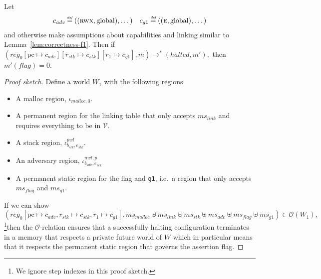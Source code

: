 \documentclass[format=acmsmall, review=true, screen=true]{acmart}
\newcommand{\update}[2]{[#1 \mapsto #2]}
\newcommand{\defeq}{\stackrel{\textit{\tiny{def}}}{=}}
\newcommand{\var}[1]{\mathit{#1}}
\newcommand{\hs}{\var{ms}}
\newcommand{\ms}{\hs}
\newcommand{\pcreg}{\mathrm{pc}}
\newcommand{\reg}{\var{reg}}
\newcommand{\adv}{\var{adv}}
\newcommand{\link}{\var{link}}
\newcommand{\stk}{\var{stk}}
\newcommand{\flag}{\var{flag}}
\newcommand{\nwl}{\var{nwl}}
\newcommand{\pwl}{\var{pwl}}
\newcommand{\halted}{\mathit{halted}}
\newcommand{\codelabel}[1]{\mathit{#1}}
\newcommand{\malloc}{\codelabel{malloc}}
\newcommand{\asmType}{\plaindom{AsmType}}
\newcommand{\plaindom}[1]{\mathrm{#1}}
\newcommand{\intr}[2]{\mathcal{#1}}
\newcommand{\valueintr}[1]{\intr{V}{#1}}
\newcommand{\stdvr}{\valueintr{\asmType}}
\newcommand{\observations}{\mathcal{O}}
\newcommand{\plainperm}[1]{\textsc{#1}}
\newcommand{\entry}{\plainperm{e}}
\newcommand{\rwx}{\plainperm{rwx}}
\newcommand{\plainlocality}[1]{\mathrm{#1}}
\newcommand{\glob}{\plainlocality{global}}
\newcommand{\step}[1][]{\rightarrow_{#1}}
\newenvironment{toplas}%
    {\color{OliveGreen}}{}
\begin{document}
\begin{lemma}
  \label{lem:correctness-g1}
  Let
\[
    \begin{array}{r@{}lr@{}l}
    c_{\var{adv}} & \;\defeq ((\rwx,\glob),\dots) & c_{g1} & \;\defeq ((\entry,\glob),\dots)
    \end{array}
\]
  and otherwise make assumptions about capabilities and linking similar to Lemma~\ref{lem:correctness-f1}.
  Then if $
  (\reg_0\update{\pcreg}{c_\adv}\update{r_\stk}{c_\stk}\update{r_1}{c_{g1}},m) \step^* (\halted,m'),$
  then $m'(\flag) = 0$.
\end{lemma}
\begin{toplas}
  \begin{proof}[Proof sketch]
    Define a world $W_1$ with the following regions
    \begin{itemize}
    \item A malloc region, $\iota_{\malloc,0}$.
    \item A permanent region for the linking table that only accepts $\ms_\link$ and requires everything to be in $\stdvr$.
    \item A stack region, $\iota^{\pwl}_{b_\stk,e_\stk}$.
    \item An adversary region, $\iota^{\nwl,p}_{b_\adv,e_\stk}$
    \item A permanent static region for the flag and \texttt{g1}, i.e.\ a region that only
      accepts $\ms_\flag$ and $\ms_{g1}$.
    \end{itemize}
    If we can show
    \begin{equation}
      (\reg_0[\pcreg \mapsto c_\adv,r_\stk\mapsto c_\stk,r_1\mapsto c_{g1}],\ms_\malloc \uplus \ms_\link \uplus \ms_\stk \uplus \ms_\adv\uplus \ms_\flag  \uplus \ms_{g1}) \in \observations(W_1),\label{eq:g1:main-O-res}
  \end{equation}
  \footnote{We ignore step indexes in this proof sketch.}then the $\observations$-relation ensures that a successfully halting configuration terminates in a memory that respects a private future world of $W$ which in particular means that it respects the permanent static region that governs the assertion flag.


\end{proof}
\end{toplas}
\end{document}

